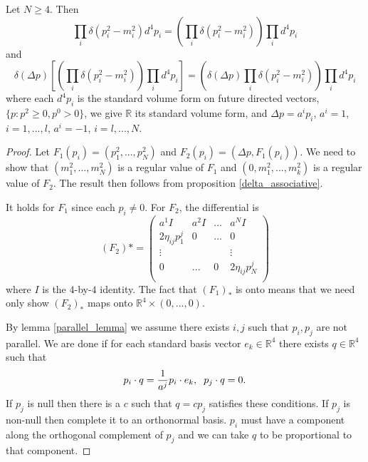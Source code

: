 \begin{lemma}
Let $N\geq 4$. Then
\begin{equation}
\prod_i \delta(p_i^2-m_i^2)d^4p_i=\left(\prod_i \delta(p_i^2-m_i^2)\right)\prod_i d^4p_i
\end{equation}
 and 
\begin{equation}
\delta(\Delta p)\left[\left(\prod_i \delta(p_i^2-m_i^2)\right)\prod_i d^4p_i\right]=\left(\delta(\Delta p)\prod_i \delta(p_i^2-m_i^2)\right)\prod_i d^4p_i
\end{equation}
where each $d^4p_i$ is the standard volume form on future directed vectors, $\{p:p^2\geq 0, p^0>0\}$, we give $\mathbb{R}$ its standard volume form, and $\Delta p=a^ip_i$, $a^i=1$, $i=1,...,l$, $a^i=-1$, $i=l,...,N$. 
\end{lemma}
\begin{proof}
Let $F_1(p_i)=(p_1^2,...,p_N^2)$ and $F_2(p_i)=(\Delta p,F_1(p_i))$.  We need to show that $(m_1^2,...,m_N^2)$ is a regular value of $F_1$ and $(0,m_1^2,...,m_k^2)$ is a regular value of $F_2$.  The result then follows from proposition \ref{delta_associative}.

It holds for $F_1$ since each $p_i\neq 0$. For $F_2$, the differential is
\begin{equation}
(F_2)*=\left( \begin{array}{cccc}
a^{1}I&a^{2}I&...& a^{N}I \\
2 \eta_{ij}p^j_1&0&...&0\\
\vdots&&&\vdots\\
0&...&0&2 \eta_{ij}p^j_N\\
\end{array} \right)
\end{equation}
where $I$ is the $4$-by-$4$ identity.  The fact that $(F_1)_*$ is onto means that we need only show $(F_2)_*$ maps onto $\mathbb{R}^4\times(0,...,0)$.  

By lemma \ref{parallel_lemma} we assume there exists $i,j$ such that $p_i,p_j$ are not parallel. We are done if for each standard basis vector $e_k\in\mathbb{R}^4$ there exists $q\in\mathbb{R}^4$ such that
\begin{equation}
p_i\cdot q=\frac{1}{a^j}p_i\cdot e_k,\hspace{2mm} p_j\cdot q=0.
\end{equation}
If $p_j$ is null then there is a $c$ such that $q=c p_j$ satisfies these conditions. If $p_j$ is non-null then complete it to an orthonormal basis.  $p_i$ must have a component along the orthogonal complement of $p_j$ and we can take $q$ to be proportional to that component.

\end{proof}


